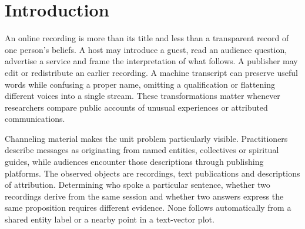 \begin{abstract}
Public material attributed to channeling is distributed as interviews, creator recordings, excerpts, authored messages and publisher transcripts. Computational comparison becomes difficult when a publishing account is treated as a speaker, a repeated word as an agreed answer, or a fitted topic as an independently established category. We examine \AudioN\ retained publisher recordings through their automatic transcripts and keep \AuthoredN\ separately published texts in a distinct comparison branch. The audio material spans \AudioHours\ hours but is concentrated in nineteen Bashar-related publisher contexts and one Athina/Ashtar episode. We combine source and storage accounting, transparent TF--IDF representations, nonnegative topic construction, clustering, lexical networks, source-exclusion sensitivities and systematic model-assisted reading of selected windows.  The contribution is an inspectable, source-bound measurement and interpretation resource for published discourse. Speaker attribution, recognition accuracy, cross-practitioner agreement and attributed communication origins remain unverified. Human validation, authorship and institutional determinations are explicitly pending.
\end{abstract}

\section{Introduction}
An online recording is more than its title and less than a transparent record of one person's beliefs. A host may introduce a guest, read an audience question, advertise a service and frame the interpretation of what follows. A publisher may edit or redistribute an earlier recording. A machine transcript can preserve useful words while confusing a proper name, omitting a qualification or flattening different voices into a single stream. These transformations matter whenever researchers compare public accounts of unusual experiences or attributed communications.

Channeling material makes the unit problem particularly visible. Practitioners describe messages as originating from named entities, collectives or spiritual guides, while audiences encounter those descriptions through publishing platforms. The observed objects are recordings, text publications and descriptions of attribution. Determining who spoke a particular sentence, whether two recordings derive from the same session and whether two answers express the same proposition requires different evidence. None follows automatically from a shared entity label or a nearby point in a text-vector plot.

